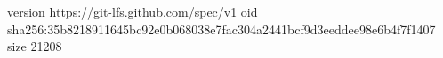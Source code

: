 version https://git-lfs.github.com/spec/v1
oid sha256:35b8218911645bc92e0b068038e7fac304a2441bcf9d3eeddee98e6b4f7f1407
size 21208
